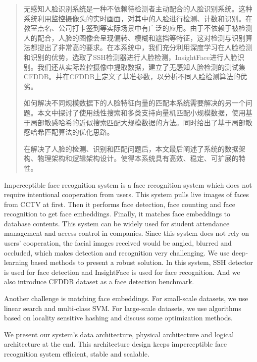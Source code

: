 
\begin{abstract}

无感知人脸识别系统是一种不依赖待检测者主动配合的人脸识别系统。这种系统利用监控摄像头的实时画面，对其中的人脸进行检测、计数和识别。在教室点名、公司打卡签到等实际场景中有广泛的应用。由于不依赖于被检测人的配合，人脸的图像会呈现偏转、模糊和遮挡等特征，这对检测与识别算法都提出了非常高的要求。在本系统中，我们充分利用深度学习在人脸检测和识别的优势，选取了SSH检测器\cite{najibi2017ssh}进行人脸检测，InsightFace\cite{deng2018arcface}进行人脸识别。我们还从实际监控摄像中提取数据，建立了无感知人脸检测的测试集CFDDB。并在CFDDB上定义了基准参数，以分析不同人脸检测算法的优劣。

如何解决不同规模数据下的人脸特征向量的匹配本系统需要解决的另一个问题。本文中探讨了使用线性搜索和多类支持向量机匹配小规模数据，使用基于局部敏感哈希的近似搜索匹配大规模数据的方法。同时给出了基于局部敏感哈希匹配算法的优化思路。

在解决了人脸的检测、识别和匹配问题后，本文最后阐述了系统的数据架构、物理架构和逻辑架构设计。使得本系统具有高效、稳定、可扩展的特性。

\end{abstract}

\begin{englishabstract}

Imperceptible face recognition system is a face recognition system which does not require intentional cooperation from users. This system pulls live images of faces from CCTV at first. Then it performs face detection, face counting and face recognition to get face embeddings. Finally, it matches face embeddings to database contents. This system can be widely used for student attendance management and access control in companies. Since this system does not rely on users’ cooperation, the facial images received would be angled, blurred and occluded, which makes detection and recognition very challenging. We use deep-learning based methods to present a robust solution. In this system, SSH detector\cite{najibi2017ssh} is used for face detection and InsightFace\cite{deng2018arcface} is used for face recognition. And we also introduce CFDDB dataset as a face detection benchmark. 

Another challenge is matching face embeddings. For small-scale datasets, we use linear search and multi-class SVM. For large-scale datasets, we use algorithms based on locality sensitive hashing and discuss some optimization methods.

We present our system’s data architecture, physical architecture and logical architecture at the end. This architecture design keeps imperceptible face recognition system efficient, stable and scalable.

\end{englishabstract}

